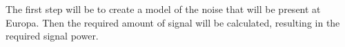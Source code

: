 \documentclass{article}
\begin{document}
The first step will be to create a model of the noise that will be present at Europa. Then the required amount of signal will be calculated, resulting in the required signal power. 



% 
% 


% 


%


%
\end{document}
